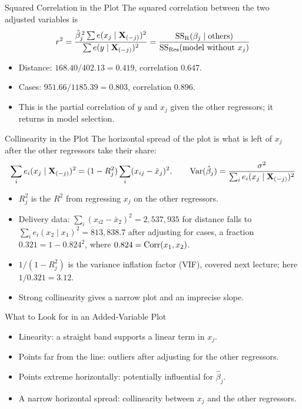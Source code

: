 \begin{frame}{Squared Correlation in the Plot}
    The squared correlation between the two adjusted variables is
    \begin{align*}
        r^2 = \frac{\hat\beta_j^{\,2}\sum e(x_j\mid\mathbf{X}_{(-j)})^2}{\sum e(y\mid\mathbf{X}_{(-j)})^2}
        = \frac{\mathrm{SS}_{\mathrm{R}}(\beta_j\mid\text{others})}{\mathrm{SS}_{\mathrm{Res}}(\text{model without }x_j)}
    \end{align*}
    \begin{itemize}
        \item Distance: $168.40/402.13=0.419$, correlation $0.647$.
        \item Cases: $951.66/1185.39=0.803$, correlation $0.896$.
        \item This is the partial correlation of $y$ and $x_j$ given the other regressors; it returns in model selection.
    \end{itemize}
\end{frame}


\begin{frame}{Collinearity in the Plot}
    The horizontal spread of the plot is what is left of $x_j$ after the other regressors take their share:
    \[
    \sum_i e_i(x_j\mid\mathbf{X}_{(-j)})^2 = (1-R_j^2)\sum_i(x_{ij}-\bar x_j)^2,
    \qquad
    \operatorname{Var}(\hat\beta_j)=\frac{\sigma^2}{\sum_i e_i(x_j\mid\mathbf{X}_{(-j)})^2}
    \]
    \begin{itemize}
        \item $R_j^2$ is the $R^2$ from regressing $x_j$ on the other regressors.
        \item Delivery data: $\sum_i(x_{i2}-\bar x_2)^2=2{,}537{,}935$ for distance falls to $\sum_i e_i(x_2\mid x_1)^2=813{,}838.7$ after adjusting for cases, a fraction $0.321=1-0.824^2$, where $0.824=\operatorname{Corr}(x_1,x_2)$.
        \item $1/(1-R_j^2)$ is the variance inflation factor (VIF), covered next lecture; here $1/0.321=3.12$.
        \item Strong collinearity gives a narrow plot and an imprecise slope.
    \end{itemize}
\end{frame}


\begin{frame}{What to Look for in an Added-Variable Plot}
    \begin{itemize}
        \item Linearity: a straight band supports a linear term in $x_j$.
        \item Points far from the line: outliers after adjusting for the other regressors.
        \item Points extreme horizontally: potentially influential for $\hat\beta_j$.
        \item A narrow horizontal spread: collinearity between $x_j$ and the other regressors.
    \end{itemize}
\end{frame}



